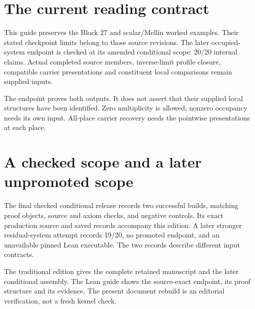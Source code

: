 \documentclass[12pt,a4paper]{article}
\begin{document}
\KomorebiCover
{}

\section*{The current reading contract}
This guide preserves the Block 27 and scalar/Mellin worked examples. Their stated checkpoint limits belong to those source revisions. The later occupied-system endpoint is checked at its amended conditional scope: 20/20 internal claims. Actual completed source members, inverse-limit profile closure, compatible carrier presentations and constituent local comparisons remain supplied inputs.
\begin{center}
\end{center}
The endpoint proves both outputs. It does not assert that their supplied local structures have been identified. Zero multiplicity is allowed; nonzero occupancy needs its own input. All-place carrier recovery needs the pointwise presentations at each place.
\clearpage
\section*{A checked scope and a later unpromoted scope}
The final checked conditional release records two successful builds, matching proof objects, source and axiom checks, and negative controls. Its exact production source and saved records accompany this edition. A later stronger residual-system attempt records 19/20, no promoted endpoint, and an unavailable pinned Lean executable. The two records describe different input contracts.

The traditional edition gives the complete retained manuscript and the later conditional assembly. The Lean guide shows the source-exact endpoint, its proof structure and its evidence. The present document rebuild is an editorial verification, not a fresh kernel check.
\clearpage
\setcounter{page}{1}\renewcommand{\thepage}{V\arabic{page}}

\end{document}
